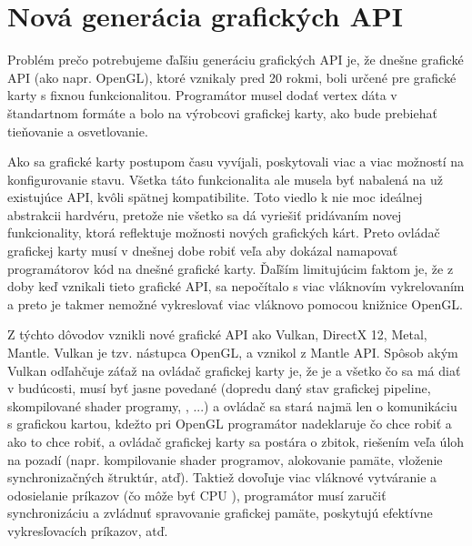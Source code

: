 \chapter{Nová generácia grafických API}
Problém prečo potrebujeme ďaľšiu generáciu grafických API je, že dnešne grafické API (ako napr. OpenGL), ktoré vznikaly pred 20 rokmi, boli určené pre grafické karty s fixnou funkcionalitou. Programátor musel dodať vertex dáta v štandartnom formáte a bolo na výrobcovi grafickej karty, ako bude prebiehať tieňovanie a osvetlovanie. 

Ako sa grafické karty postupom času vyvíjali, poskytovali viac a viac možností na konfigurovanie stavu. Všetka táto funkcionalita ale musela byť nabalená na už existujúce API, kvôli spätnej kompatibilite. Toto viedlo k nie moc ideálnej abstrakcii hardvéru, pretože nie všetko sa dá vyriešiť pridávaním novej funkcionality, ktorá reflektuje možnosti nových grafických kárt. Preto ovládač grafickej karty musí v dnešnej dobe robiť veľa  aby dokázal namapovať programátorov kód na dnešné grafické karty. Ďaľším limitujúcim faktom je, že z doby keď vznikali tieto grafické API, sa nepočítalo s viac vláknovím vykrelovaním a preto je takmer nemožné vykreslovať viac vláknovo pomocou knižnice OpenGL.

Z týchto dôvodov vznikli nové grafické API ako Vulkan, DirectX 12, Metal, Mantle. 
Vulkan je tzv. nástupca OpenGL, a vznikol z Mantle API. 
Spôsob akým Vulkan odľahčuje záťaž na ovládač grafickej karty je, že je  a všetko čo sa má diať v budúcosti, musí byť jasne povedané (dopredu daný stav grafickej pipeline, skompilované shader programy, \todo{}, ...) a ovládač sa stará najmä len o komunikáciu s grafickou kartou, kdežto pri OpenGL programátor nadeklaruje čo chce robiť a ako to chce robiť, a ovládač grafickej karty sa postára o zbitok, riešením veľa úloh na pozadí (napr. kompilovanie shader programov, alokovanie pamäte, vloženie synchronizačných štruktúr, atď). 
Taktiež dovoľuje viac vláknové vytváranie a odosielanie príkazov (čo môže byť CPU ), programátor musí zaručiť synchronizáciu a zvládnuť spravovanie grafickej pamäte, poskytujú efektívne  vykresľovacích príkazov, atď.

